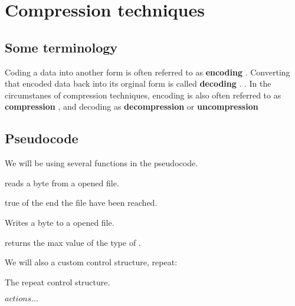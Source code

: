 \begin{comment}
  
\end{comment}

\chapter{Compression techniques}
\label{cha:digital-image}

\begin{refsection}

\section{Some terminology}
\label{sec:some-terminology}

Coding a data into another form is often referred to as
\textbf{encoding} . Converting that encoded data back
into its orginal form is called \textbf{decoding}
. . In the
circumstanes of compression techniques, encoding is also often
referred to as \textbf{compression} , and decoding as
\textbf{decompression}  or \textbf{uncompression} 


\section{Pseudocode}
\label{sec:pseudocode}

We will be using several functions in the pseudocode.

 reads a byte from a opened file.

 true of the end the file have been
reached.

 Writes a byte to a opened file.

 returns the max value of the type of
.

We will also a custom control structure, repeat:

\begin{algorithm}[h]
  \caption{The repeat control structure.}
  \label{alg:repeat}
  \begin{algorithmic}[1]
      \State $actions...$  %
    \EndRepeat
  \end{algorithmic}
\end{algorithm}


\end{refsection}
